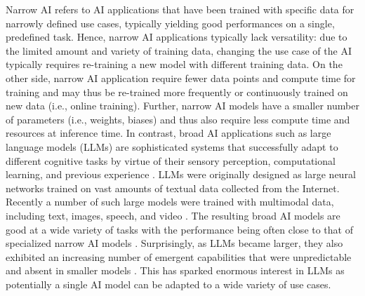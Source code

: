Narrow AI refers to AI applications that have been trained with specific data for narrowly defined use
cases, typically yielding good performances on a single, predefined task. Hence, narrow AI applications typically lack
versatility: due to the limited amount and variety of training data, changing the use case of the AI typically
requires re-training a new model with different training data. On the other side, narrow AI application require fewer
data points and compute time for training and may thus be re-trained more frequently or continuously trained on new data
(i.e., online training). Further, narrow AI models have a smaller number of parameters (i.e., weights, biases) and
thus also require less compute time and resources at inference time.
In contrast, broad AI applications such as large language models (LLMs) are sophisticated systems that successfully
adapt to different cognitive tasks by virtue of their sensory perception, computational learning, and
previous experience \citep{hochreiterBroadAI2022}. LLMs were originally designed as large neural networks trained
on vast amounts of textual data collected from the Internet. Recently a number of such large models were trained
with multimodal data, including text, images, speech, and video \citep{bommasaniOpportunitiesRisksFoundation2022}.
The resulting broad AI models are good at a wide variety of tasks with the performance being often close to that of
specialized narrow AI models \citep{bommasaniOpportunitiesRisksFoundation2022}. Surprisingly, as LLMs became larger,
they also exhibited an increasing number of emergent capabilities that were unpredictable and absent in smaller models
\citep{weiEmergentAbilitiesLarge2022}. This has sparked enormous interest in LLMs as potentially a single AI model 
can be adapted to a wide variety of use cases. 

